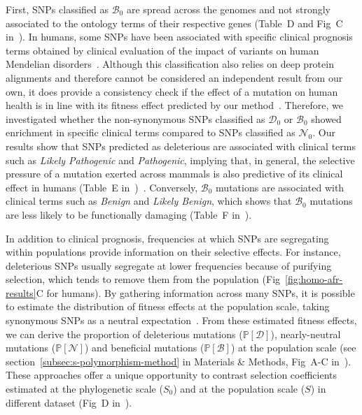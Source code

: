 \documentclass[10pt,letterpaper]{article}
\newcommand{\proba}{\mathbb{P}}
\newcommand{\Sphy}{S_{0}}
\newcommand{\SphyDel}{\mathcal{D}_0}
\newcommand{\SphyNeu}{\mathcal{N}_0}
\newcommand{\SphyBen}{\mathcal{B}_0}
\newcommand{\Spop}{S}
\newcommand{\SpopDel}{\mathcal{D}}
\newcommand{\SpopNeu}{\mathcal{N}}
\newcommand{\SpopBen}{\mathcal{B}}
\newcommand{\ProbaPopDel}{\proba [ \SpopDel]}
\newcommand{\ProbaPopNeu}{\proba [ \SpopNeu ]}
\newcommand{\ProbaPopBen}{\proba [ \SpopBen ]}
\begin{document}
First, SNPs classified as $\SphyBen$ are spread across the genomes and not strongly associated to the ontology terms of their respective genes (Table~D and Fig~C in~).
In humans, some SNPs have been associated with specific clinical prognosis terms obtained by clinical evaluation of the impact of variants on human Mendelian disorders~\cite{landrum_clinvar_2018}.
Although this classification also relies on deep protein alignments and therefore cannot be considered an independent result from our own, it does provide a consistency check if the effect of a mutation on human health is in line with its fitness effect predicted by our method~\cite{grimm_evaluation_2015}.
Therefore, we investigated whether the non-synonymous SNPs classified as $\SphyDel$ or $\SphyBen$ showed enrichment in specific clinical terms compared to SNPs classified as $\SphyNeu$.
Our results show that SNPs predicted as deleterious are associated with clinical terms such as \textit{Likely Pathogenic} and \textit{Pathogenic}, implying that, in general, the selective pressure of a mutation exerted across mammals is also predictive of its clinical effect in humans (Table~E in~)~\cite{sullivan_leveraging_2023}.
Conversely, $\SphyBen$ mutations are associated with clinical terms such as \textit{Benign} and \textit{Likely Benign}, which shows that $\SphyBen$ mutations are less likely to be functionally damaging (Table~F in~).

In addition to clinical prognosis, frequencies at which SNPs are segregating within populations provide information on their selective effects.
For instance, deleterious SNPs usually segregate at lower frequencies because of purifying selection, which tends to remove them from the population (Fig~\ref{fig:homo-afr-results}C for humans).
By gathering information across many SNPs, it is possible to estimate the distribution of fitness effects at the population scale, taking synonymous SNPs as a neutral expectation~\cite{eyre-walker_distribution_2006, eyre-walker_estimating_2009, galtier_adaptive_2016, tataru_inference_2017}.
From these estimated fitness effects, we can derive the proportion of deleterious mutations ($\ProbaPopDel$), nearly-neutral mutations ($\ProbaPopNeu$) and beneficial mutations ($\ProbaPopBen$) at the population scale (see section~\ref{subsec:s-polymorphism-method} in Materials \& Methods, Fig~A-C in~).
These approaches offer a unique opportunity to contrast selection coefficients estimated at the phylogenetic scale ($\Sphy$) and at the population scale ($\Spop$) in different dataset (Fig~D in~).
\end{document}
